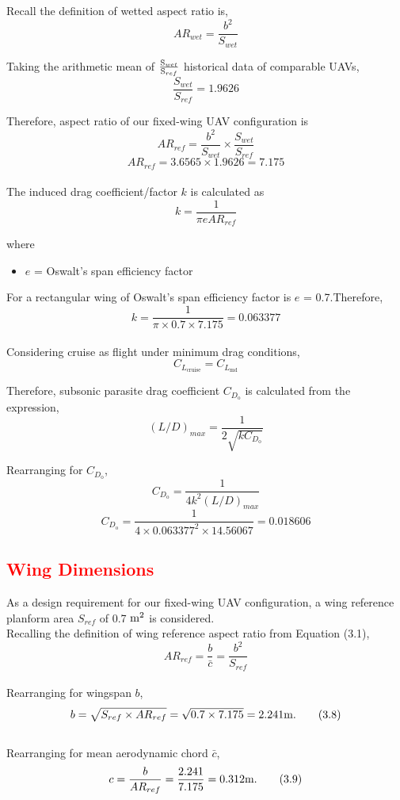 \documentclass[12 pt]{article}
\begin{document}
Recall the definition of wetted aspect ratio is,
\[{AR}_{wet} = \frac{b^2}{S_{wet}}\tag{3.3}\]

Taking the arithmetic mean of ${\frac {\text S_{wet}}{\text S_{ref}}}$ historical data of comparable UAVs, $${\frac {S_{wet}}{S_{ref}}} = 1.9626 $$

Therefore, aspect ratio of our fixed-wing UAV configuration is
\[{AR}_{ref} = \frac{b^2}{S_{wet}} \times \frac {S_{wet}}{S_{ref}}\tag{3.4}\]
\[{AR}_{ref} = 3.6565 \times 1.9626 = 7.175 \]\\

The induced drag coefficient/factor ${k}$ is calculated as
\[{k} = \frac{1}{\pi e {AR}_{ref} }\tag{3.5}\]

where
\begin{itemize}
\item[] ${e}$ = Oswalt's span efficiency factor\\
\end{itemize}

For a rectangular wing of Oswalt's span efficiency factor is ${e}$ = 
0.7.Therefore, 
\[{k} = \frac{1}{\pi \times 0.7 \times 7.175} = 0.063377\]\\

Considering cruise as flight under minimum drag conditions, $$C_{L_{\text{cruise}}} =C_{L_{\text{md}}}$$

Therefore, subsonic parasite drag coefficient $C_{D_{\text{o}}}$ is calculated from the expression,
\[{{(L/D)}_{max}} = \frac{1}{2\sqrt{kC_{D_{\text{o}}}}}\tag{3.6}\]

Rearranging for $C_{D_{\text{o}}}$,
\[C_{D_{\text{o}}} = \frac{1}{4{k}^{2}{{(L/D)}_{max}}} \tag{3.7}\]
\[C_{D_{\text{o}}} = \frac{1}{4\times{0.063377}^{2}\times14.56067} = 0.018606\]
\subsection{\textcolor{red}{Wing Dimensions}}
As a design requirement for our fixed-wing UAV configuration, a wing reference planform area ${S_{ref}}$ of 0.7 $\text m^2$ is considered.\\

Recalling the definition of wing reference aspect ratio from Equation (3.1), 
\[ {AR}_{ref} = \frac {b}{\bar c} =\frac {b^2}{S_{ref}} \]\\
\indent Rearranging for wingspan $b$,
\[ b = \sqrt{{S_{ref}} \times {AR}_{ref}} = \sqrt{0.7 \times 7.175} = 2.241 {\text m.}\tag{3.8}\]\\
\indent Rearranging for mean aerodynamic chord ${\bar c}$,
\[c = \frac{b}{{AR}_{ref}} = \frac{2.241}{7.175} = 0.312 {\text m.}\tag{3.9} \]
\end{document}
